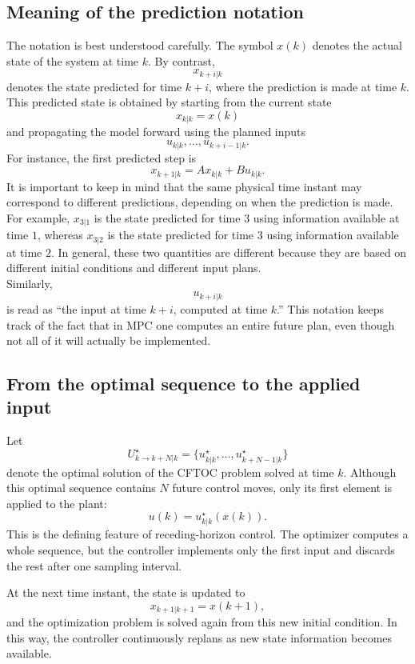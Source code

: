 \subsection{Meaning of the prediction notation}

The notation is best understood carefully. The symbol \(x(k)\) denotes the actual state of the
system at time \(k\). By contrast,
\[
x_{k+i|k}
\]
denotes the state predicted for time \(k+i\), where the prediction is made at time \(k\). This
predicted state is obtained by starting from the current state
\[
x_{k|k}=x(k)
\]
and propagating the model forward using the planned inputs
\[
u_{k|k},\dots,u_{k+i-1|k}.
\]
For instance, the first predicted step is
\[
x_{k+1|k}=Ax_{k|k}+Bu_{k|k}.
\]
It is important to keep in mind that the same physical time instant may correspond to different
predictions, depending on when the prediction is made. For example, \(x_{3|1}\) is the state
predicted for time \(3\) using information available at time \(1\), whereas \(x_{3|2}\) is the state
predicted for time \(3\) using information available at time \(2\). In general, these two
quantities are different because they are based on different initial conditions and different input
plans.\\
Similarly,
\[
u_{k+i|k}
\]
is read as “the input at time \(k+i\), computed at time \(k\).” This notation keeps track of the
fact that in MPC one computes an entire future plan, even though not all of it will actually be
implemented.

\subsection{From the optimal sequence to the applied input}

Let
\[
U_{k\to k+N|k}^\star
=
\{u_{k|k}^\star,\dots,u_{k+N-1|k}^\star\}
\]
denote the optimal solution of the CFTOC problem solved at time \(k\). Although this optimal
sequence contains \(N\) future control moves, only its first element is applied to the plant:
\[
u(k)=u_{k|k}^\star(x(k)).
\]
This is the defining feature of receding-horizon control. The optimizer computes a whole
sequence, but the controller implements only the first input and discards the rest after one
sampling interval.

At the next time instant, the state is updated to
\[
x_{k+1|k+1}=x(k+1),
\]
and the optimization problem is solved again from this new initial condition. In this way, the
controller continuously replans as new state information becomes available.

